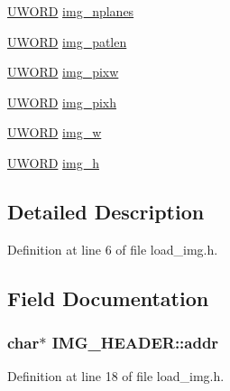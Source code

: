\begin{DoxyCompactItemize}
\item 
\hyperlink{bitmfile_8h_a0428171499a4ab7aebc2bf058ae337df}{U\+W\+O\+R\+D} \hyperlink{structIMG__HEADER_a0371340a9a26039949001413dde2b128}{img\+\_\+nplanes}
\item 
\hyperlink{bitmfile_8h_a0428171499a4ab7aebc2bf058ae337df}{U\+W\+O\+R\+D} \hyperlink{structIMG__HEADER_a556c0023a2d062dbfde5d3a019eced72}{img\+\_\+patlen}
\item 
\hyperlink{bitmfile_8h_a0428171499a4ab7aebc2bf058ae337df}{U\+W\+O\+R\+D} \hyperlink{structIMG__HEADER_a7d5c243cda9e3046c3da9421d0cc42c5}{img\+\_\+pixw}
\item 
\hyperlink{bitmfile_8h_a0428171499a4ab7aebc2bf058ae337df}{U\+W\+O\+R\+D} \hyperlink{structIMG__HEADER_a8cc61573c18a478c0675f78ba8241731}{img\+\_\+pixh}
\item 
\hyperlink{bitmfile_8h_a0428171499a4ab7aebc2bf058ae337df}{U\+W\+O\+R\+D} \hyperlink{structIMG__HEADER_a45fcc47a3c57f859f69315792c681377}{img\+\_\+w}
\item 
\hyperlink{bitmfile_8h_a0428171499a4ab7aebc2bf058ae337df}{U\+W\+O\+R\+D} \hyperlink{structIMG__HEADER_a7d50a3aca8261f67064db57bbe0d6d06}{img\+\_\+h}
\end{DoxyCompactItemize}


\subsection{Detailed Description}


Definition at line 6 of file load\+\_\+img.\+h.



\subsection{Field Documentation}
\hypertarget{structIMG__HEADER_a02e180ad82eed90e0aee536a3cfe62ac}{
\subsubsection[{addr}]{\setlength{\rightskip}{0pt plus 5cm}char$\ast$ I\+M\+G\+\_\+\+H\+E\+A\+D\+E\+R\+::addr}}\label{structIMG__HEADER_a02e180ad82eed90e0aee536a3cfe62ac}


Definition at line 18 of file load\+\_\+img.\+h.



